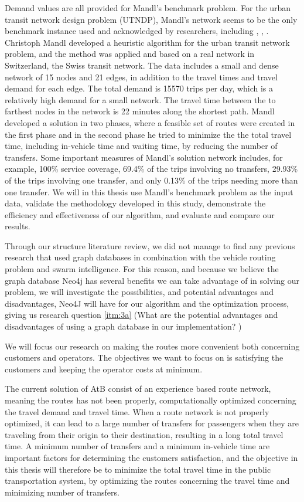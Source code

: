 Demand values are all provided for Mandl's benchmark problem. For the urban transit network design problem (UTNDP), Mandl's network seems to be the only benchmark instance used and acknowledged by researchers, including \citep{fan09}, \citep{kechagiopoulos14}, \citep{nikolic14}. Christoph Mandl \citep{mandl79} developed a heuristic algorithm for the urban transit network problem, and the method was applied and based on a real network in Switzerland, the Swiss transit network\citep{mandl80}. The data includes a small and dense network of 15 nodes and 21 edges, in addition to the travel times and travel demand for each edge. The total demand is 15570 trips per day, which is a relatively high demand for a small network. The travel time between the to farthest nodes in the network is 22 minutes along the shortest path. Mandl developed a solution in two phases, where a feasible set of routes were created in the first phase and in the second phase he tried to minimize the the total travel time, including in-vehicle time and waiting time, by reducing the number of transfers. Some important measures of Mandl's solution network includes, for example, 100\% service coverage, 69.4\% of the trips involving no transfers, 29.93\% of the trips involving one transfer, and only 0.13\% of the trips needing more than one transfer. We will in this thesis use Mandl's benchmark problem \citep{mandl79} as the input data, validate the methodology developed in this study, demonstrate the efficiency and effectiveness of our algorithm, and evaluate and compare our results. 

Through our structure literature review, we did not manage to find any previous research that used graph databases in combination with the vehicle routing problem and swarm intelligence. For this reason, and because we believe the graph database Neo4j \citep{website:neo4j} has several benefits we can take advantage of in solving our problem, we will investigate the possibilities, and potential advantages and disadvantages, Neo4J will have for our algorithm and the optimization process, giving us research question \vref{itm:3a} (What are the potential advantages and disadvantages of using a graph database in our implementation? )

We will focus our research on making the routes more convenient both concerning customers and operators. The objectives we want to focus on is satisfying the customers and keeping the operator costs at minimum. 

The current solution of AtB \citep{website:atb} consist of an experience based route network, meaning the routes has not been properly, computationally optimized concerning the travel demand and travel time. When a route network is not properly optimized, it can lead to a large number of transfers for passengers when they are traveling from their origin to their destination, resulting in a long total travel time. A minimum number of transfers and a minimum in-vehicle time are important factors for determining the customers satisfaction, and the objective in this thesis will therefore be to minimize the total travel time in the public transportation system, by optimizing the routes concerning the travel time and minimizing number of transfers. %

